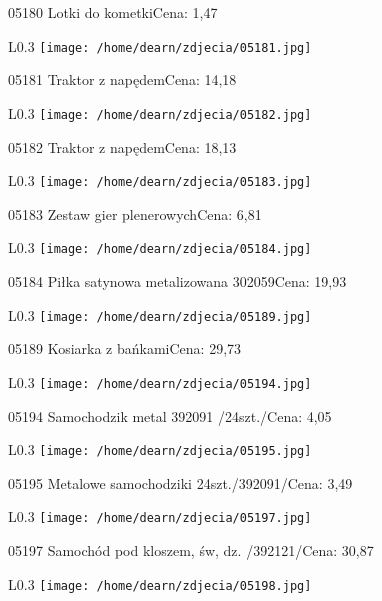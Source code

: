 05180 Lotki do kometkiCena: 1,47\newline
\begin{wrapfigure}{L}{0.3\textwidth}
\texttt{[image: /home/dearn/zdjecia/05181.jpg]}
\end{wrapfigure}
05181 Traktor z napędemCena: 14,18\newline
\begin{wrapfigure}{L}{0.3\textwidth}
\texttt{[image: /home/dearn/zdjecia/05182.jpg]}
\end{wrapfigure}
05182 Traktor z napędemCena: 18,13\newline
\begin{wrapfigure}{L}{0.3\textwidth}
\texttt{[image: /home/dearn/zdjecia/05183.jpg]}
\end{wrapfigure}
05183 Zestaw gier plenerowychCena: 6,81\newline
\begin{wrapfigure}{L}{0.3\textwidth}
\texttt{[image: /home/dearn/zdjecia/05184.jpg]}
\end{wrapfigure}
05184 Piłka satynowa metalizowana 302059Cena: 19,93\newline
\begin{wrapfigure}{L}{0.3\textwidth}
\texttt{[image: /home/dearn/zdjecia/05189.jpg]}
\end{wrapfigure}
05189 Kosiarka z bańkamiCena: 29,73\newline
\begin{wrapfigure}{L}{0.3\textwidth}
\texttt{[image: /home/dearn/zdjecia/05194.jpg]}
\end{wrapfigure}
05194 Samochodzik metal 392091 /24szt./Cena: 4,05\newline
\begin{wrapfigure}{L}{0.3\textwidth}
\texttt{[image: /home/dearn/zdjecia/05195.jpg]}
\end{wrapfigure}
05195 Metalowe samochodziki 24szt./392091/Cena: 3,49\newline
\begin{wrapfigure}{L}{0.3\textwidth}
\texttt{[image: /home/dearn/zdjecia/05197.jpg]}
\end{wrapfigure}
05197 Samochód pod kloszem, św, dz. /392121/Cena: 30,87\newline
\begin{wrapfigure}{L}{0.3\textwidth}
\texttt{[image: /home/dearn/zdjecia/05198.jpg]}
\end{wrapfigure}
